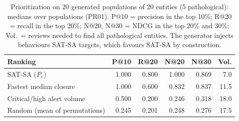 \begin{table}[!htbp]
\caption{Prioritization on 20 generated populations of
20 entities (5 pathological): medians over
populations (PR01). P@10 = precision in the top 10\%; R@20 = recall in the top 20\%;
N@20, N@30 = NDCG in the top 20\% and 30\%; Vol.\ = reviews needed to find all
pathological entities. The generator injects behaviours SAT-SA targets, which favours
SAT-SA by construction.}
\label{tab:prio}
\centering
\small
\setlength{\tabcolsep}{3pt}
\begin{tabular}{@{}L{3.9cm}rrrrr@{}}
\toprule
Ranking & P@10 & R@20 & N@20 & N@30 & Vol. \\
\midrule
SAT-SA ($P_e$) & 1.000 & 0.800 & 1.000 & 0.869 & 7.0 \\
Fastest median closure & 1.000 & 0.600 & 0.832 & 0.837 & 11.5 \\
Critical/high alert volume & 0.500 & 0.200 & 0.246 & 0.318 & 18.0 \\
Random (mean of permutations) & 0.245 & 0.201 & 0.248 & 0.276 & 17.5 \\
\bottomrule
\end{tabular}
\end{table}
